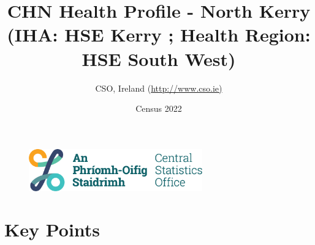 \documentclass{article}
\title{CHN Health Profile - North Kerry (IHA: HSE Kerry ;  Health Region: HSE South West) }
\date{Census 2022}
\author{CSO, Ireland  (\url{http://www.cso.ie)}}
\begin{document}


\begin{figure}
	\centering
\includegraphics[width =75mm]{../figures/CSO_Logo.png}
\end{figure}

				 
		   
						  
														  
																																													
												 
			 
\maketitle
					
													   
				 
						 
																																																																											   
				 
				  
  \pagebreak
    	    \tableofcontents

\pagebreak


\section{Key Points}
\end{document}
